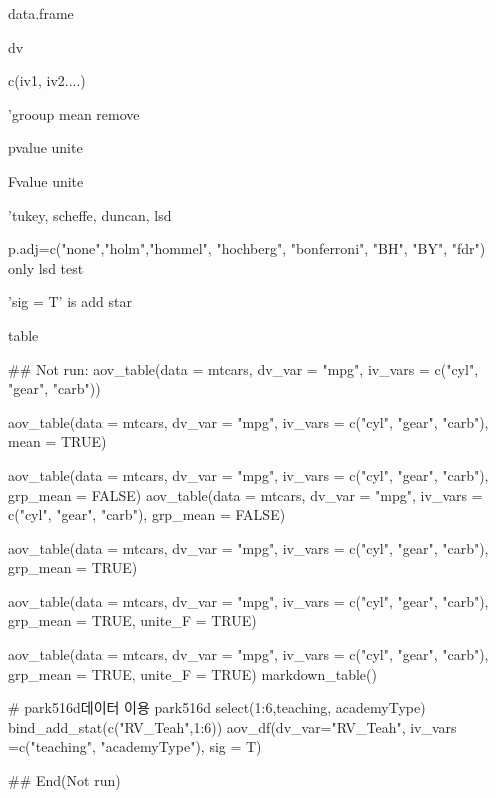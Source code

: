 \documentclass[a4paper]{book}
\begin{document}
%
\begin{Arguments}
\begin{ldescription}
\item[\code{data}] data.frame

\item[\code{dv\_var}] dv

\item[\code{iv\_vars}] c(iv1, iv2....)

\item[\code{grp\_mean}] 'grooup mean remove

\item[\code{unite\_p}] pvalue unite

\item[\code{unite\_F}] Fvalue unite

\item[\code{posthoc}] 'tukey, scheffe, duncan, lsd

\item[\code{p.adj}] p.adj=c("none","holm","hommel", "hochberg", "bonferroni", "BH", "BY", "fdr") only lsd test

\item[\code{sig}] 'sig = T' is add star
\end{ldescription}
\end{Arguments}
%
\begin{Value}
table
\end{Value}
%
\begin{Examples}
\begin{ExampleCode}

\#\# Not run: 
aov_table(data = mtcars, dv_var = "mpg",
iv_vars = c("cyl", "gear", "carb"))

aov_table(data = mtcars, dv_var = "mpg",
iv_vars = c("cyl", "gear", "carb"),
           mean = TRUE)

aov_table(data = mtcars, dv_var = "mpg",
iv_vars = c("cyl", "gear", "carb"), grp_mean = FALSE)
aov_table(data = mtcars, dv_var = "mpg",
iv_vars = c("cyl", "gear", "carb"), grp_mean = FALSE) %


aov_table(data = mtcars, dv_var = "mpg",
iv_vars = c("cyl", "gear", "carb"),
 grp_mean = TRUE)

aov_table(data = mtcars, dv_var = "mpg",
 iv_vars = c("cyl", "gear", "carb"),
 grp_mean = TRUE, unite_F = TRUE)

aov_table(data = mtcars, dv_var = "mpg",
iv_vars = c("cyl", "gear", "carb"),
 grp_mean = TRUE, unite_F = TRUE) %
  markdown_table()

# park516d데이터 이용
park516d %
  select(1:6,teaching, academyType) %
  bind_add_stat(c("RV_Teah",1:6)) %
  aov_df(dv_var="RV_Teah",
         iv_vars =c("teaching", "academyType"), sig = T)



## End(Not run)


\end{ExampleCode}
\end{Examples}
\end{document}
